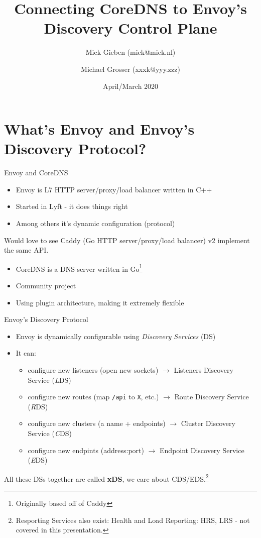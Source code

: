 \documentclass[aspectratio=169]{beamer}
\title{Connecting CoreDNS to Envoy's Discovery Control Plane}
\date{April/March 2020}
\author{Miek Gieben (miek@miek.nl) \and Michael Grosser (xxxk@yyy.zzz)}
\institute{Centre for protobuf Nerding}
\begin{document}
    \let\oldfootnotesize\footnotesize
    \renewcommand*{\footnotesize}{\oldfootnotesize\tiny}

    \maketitle

    \section{What's Envoy and Envoy's Discovery Protocol?}
    \begin{frame}{Envoy and CoreDNS}
        \begin{itemize}
            \item Envoy is L7 HTTP server/proxy/load balancer written in C++
            \item Started in Lyft - it does things right
            \item Among others it's dynamic configuration (protocol)
        \end{itemize}
        Would love to see Caddy (Go HTTP server/proxy/load balancer) v2 implement the same API.
        \begin{itemize}
            \item CoreDNS is a DNS server written in Go\footnote{Originally based off of Caddy}
            \item Community project
            \item Using plugin architecture, making it extremely flexible
        \end{itemize}
    \end{frame}

    \begin{frame}{Envoy's Discovery Protocol}
        \begin{itemize}
            \item Envoy is dynamically configurable using \emph{Discovery Services} (DS)
            \item It can:
            \begin{itemize}
                \item configure new listeners (open new sockets) $\rightarrow$ Listeners Discovery Service (\emph{L}DS)
                \item configure new routes (map \texttt{/api} to \texttt{X}, etc.) $\rightarrow$ Route Discovery Service (\emph{R}DS)
                \item configure new clusters (a name + endpoints) $\rightarrow$ Cluster Discovery Service (\emph{C}DS)
                \item configure new endpints (address:port) $\rightarrow$ Endpoint Discovery Service (\emph{E}DS)
            \end{itemize}
        \end{itemize}

        All these DSs together are called {\bf xDS}, we care about CDS/EDS.\footnote{Resporting Services also exist: Health and Load
        Reporting: HRS, LRS - not covered in this presentation.}
    \end{frame}
\end{document}
